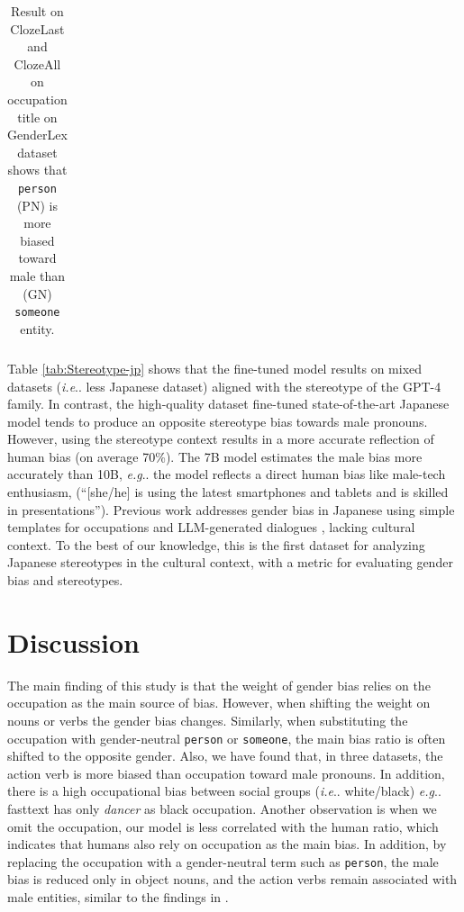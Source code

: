\documentclass[11pt]{article}
\makeatletter
\newcommand{\R}[1]{{\color{black} {#1}}}
\newcommand{\q}[1]{``#1''}
\def\eg{\emph{e.g}\onedot} \def\Eg{\emph{E.g}\onedot}
\def\ie{\emph{i.e}\onedot} \def\Ie{\emph{I.e}\onedot}
\DeclareRobustCommand\ie{%
  \UKUS@comma{i.e}%
}
\DeclareRobustCommand\eg{%
  \UKUS@comma{e.g}%
}
\DeclareRobustCommand\onedot{\futurelet\@let@token\@onedot}
\def\@onedot{\ifx\@let@token.\else.\null\fi\xspace}
\DeclareRobustCommand\onedot{\futurelet\@let@token\@onedot}
\def\@onedot{\ifx\@let@token.\else.\null\fi\xspace}
\DeclareRobustCommand\onedot{\futurelet\@let@token\@onedot}
\def\@onedot{\ifx\@let@token.\else.\null\fi\xspace}
\def\eg{\emph{e.g}\onedot} \def\Eg{\emph{E.g}\onedot}
\def\ie{\emph{i.e}\onedot} \def\Ie{\emph{I.e}\onedot}
\makeatother
\begin{document}
{{\begin{table}[t!]
{\begin{tabular}{lcccccccc}
      
    \end{tabular}
    } 
\vspace{-0.2cm}
        \caption{\R{Result on ClozeLast and ClozeAll on occupation title on GenderLex dataset shows that \texttt{person} (PN) is more biased toward male than (GN) \texttt{someone} entity.}}



\label{ablation_study_genderlex_person}
    
\end{table}

Table \ref{tab:Stereotype-jp} shows that the fine-tuned model results on mixed datasets (\ie less Japanese dataset)  aligned with the stereotype of the GPT-4 family. In contrast, the high-quality dataset fine-tuned state-of-the-art Japanese model tends to produce an opposite stereotype bias towards male pronouns. However, using the stereotype context results in a more accurate reflection of human bias (on average 70\%). The 7B model estimates the male bias more accurately than 10B, \eg the model reflects a direct human bias like male-tech enthusiasm, (\q{[she/he] is using the latest smartphones and tablets and is skilled in presentations}). \R{Previous work addresses gender bias in Japanese using simple templates for occupations \cite{kaneko2022gender} and LLM-generated dialogues \cite{zhao2024gender}, lacking cultural context. To the best of our knowledge, this is the first dataset for analyzing Japanese stereotypes in the cultural context, with a metric for evaluating gender bias and stereotypes.} 

\section{Discussion}

The main finding of this study is that the weight of gender bias relies on the occupation as the main source of bias. However, when shifting the weight on nouns or verbs the gender bias changes. Similarly, when substituting the occupation with gender-neutral \texttt{person} or \texttt{someone}, the main bias ratio is often shifted to the opposite gender. Also, we have found that, in three datasets, the action verb is more biased than occupation toward male pronouns. In addition, there is a high occupational bias between social groups (\ie white/black) \eg fasttext has only \textit{dancer} as black occupation. Another observation is when we omit the occupation, our model is less correlated with the human ratio, which indicates that humans also rely on occupation as the main bias. In addition, by replacing the occupation with a gender-neutral term such as \texttt{person}, the male bias is reduced only in object nouns, and the action verbs remain associated with male entities, similar to the findings in \cite{bailey2022people_men}.


}}
\end{document}
